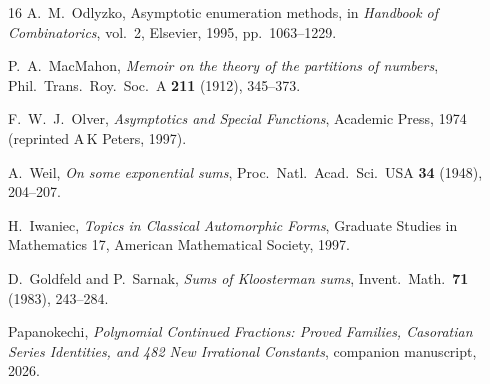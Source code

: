 \documentclass[11pt,a4paper]{article}
\begin{document}
\begin{thebibliography}{16}
A.~M.~Odlyzko,
Asymptotic enumeration methods, in
\emph{Handbook of Combinatorics}, vol.~2, Elsevier, 1995, pp.~1063--1229.

P.~A.~MacMahon,
\textit{Memoir on the theory of the partitions of numbers},
Phil.\ Trans.\ Roy.\ Soc.\ A \textbf{211} (1912), 345--373.

F.~W.~J.~Olver,
\emph{Asymptotics and Special Functions},
Academic Press, 1974 (reprinted A\,K Peters, 1997).

A.~Weil,
\textit{On some exponential sums},
Proc.\ Natl.\ Acad.\ Sci.\ USA \textbf{34} (1948), 204--207.

H.~Iwaniec,
\emph{Topics in Classical Automorphic Forms},
Graduate Studies in Mathematics 17, American Mathematical Society, 1997.

D.~Goldfeld and P.~Sarnak,
\textit{Sums of Kloosterman sums},
Invent.\ Math.\ \textbf{71} (1983), 243--284.

Papanokechi,
\textit{Polynomial Continued Fractions: Proved Families, Casoratian Series Identities, and 482 New Irrational Constants},
companion manuscript, 2026.

\end{thebibliography}
\end{document}
